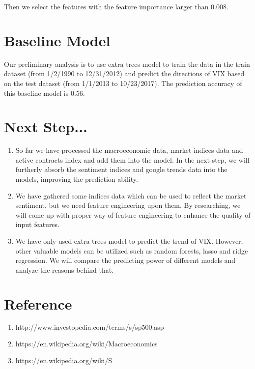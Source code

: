 \documentclass{article}
\begin{document}
Then we select the features with the feature importance larger than 0.008. 

\section*{Baseline Model}

Our preliminary analysis is to use extra trees model to train the data in the train dataset (from 1/2/1990 to 12/31/2012) and predict the directions of VIX based on the test dataset (from 1/1/2013 to 10/23/2017). The prediction accuracy of this baseline model is 0.56. 

\section*{Next Step...}

\begin{enumerate}

    \item So far we have processed the macroeconomic data, market indices data and active contracts index and add them into the model. In the next step, we will furtherly absorb the sentiment indices and google trends data into the models, improving the prediction ability.
    \item We have gathered some indices data which can be used to reflect the market sentiment, but we need feature engineering upon them. By researching, we will come up with proper way of feature engineering to enhance the quality of input features.
    \item  We have only used extra trees model to predict the trend of VIX. However, other valuable models can be utilized such as random forests, lasso and ridge regression. We will compare the predicting power of different models and analyze the reasons behind that. 
    
\end{enumerate}

\section*{Reference}
\begin{enumerate}
    \item http://www.investopedia.com/terms/s/sp500.asp
    \item https://en.wikipedia.org/wiki/Macroeconomics
    \item https://en.wikipedia.org/wiki/S%
\end{enumerate}
\end{document}

